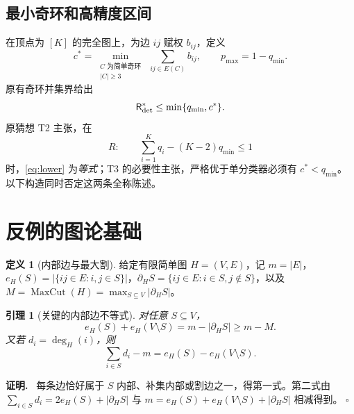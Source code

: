 \documentclass[11pt,a4paper]{ctexart}
\newtheorem{lemma}[theorem]{引理}
\theoremstyle{definition}
\newtheorem{definition}[theorem]{定义}
\newenvironment{proofcn}{\par\noindent\textbf{证明.}\ }{\hfill $\square$\par}
\newcommand{\Risk}{\mathsf R}
\newcommand{\MaxCut}{\operatorname{MaxCut}}
\begin{document}
\subsection{最小奇环和高精度区间}
在顶点为 $[K]$ 的完全图上，为边 $ij$ 赋权 $b_{ij}$，定义
\begin{equation}
c^*=\min_{\substack{C\text{ 为简单奇环}\\ |C|\ge3}}\ \sum_{ij\in E(C)}b_{ij},\qquad
p_{\max}=1-q_{\min}.
\end{equation}
原有奇环并集界给出
\begin{equation}\label{eq:lower}
\Risk^*_{\rm det}\le \min\{q_{\min},c^*\}.
\end{equation}
原猜想 T2 主张，在
\begin{equation}\label{eq:R}
R:\qquad \sum_{i=1}^Kq_i-(K-2)q_{\min}\le1
\end{equation}
时，\eqref{eq:lower} 为\emph{等式}；T3 的必要性主张，严格优于单分类器必须有 $c^*<q_{\min}$。以下构造同时否定这两条全称陈述。

\section{反例的图论基础}
\begin{definition}[内部边与最大割]
给定有限简单图 $H=(V,E)$，记 $m=|E|$，$e_H(S)=|\{ij\in E:i,j\in S\}|$，$\partial_HS=\{ij\in E:i\in S,j\notin S\}$，以及 $M=\MaxCut(H)=\max_{S\subseteq V}|\partial_HS|$。
\end{definition}

\begin{lemma}[关键的内部边不等式]\label{lem:internal}
对任意 $S\subseteq V$，
\begin{equation}\label{eq:internal}
e_H(S)+e_H(V\setminus S)=m-|\partial_HS|\ge m-M.
\end{equation}
又若 $d_i=\deg_H(i)$，则
\begin{equation}\label{eq:degree}
\sum_{i\in S}d_i-m=e_H(S)-e_H(V\setminus S).
\end{equation}
\end{lemma}
\begin{proofcn}
每条边恰好属于 $S$ 内部、补集内部或割边之一，得第一式。第二式由 $\sum_{i\in S}d_i=2e_H(S)+|\partial_HS|$ 与 $m=e_H(S)+e_H(V\setminus S)+|\partial_HS|$ 相减得到。
\end{proofcn}
\end{document}
